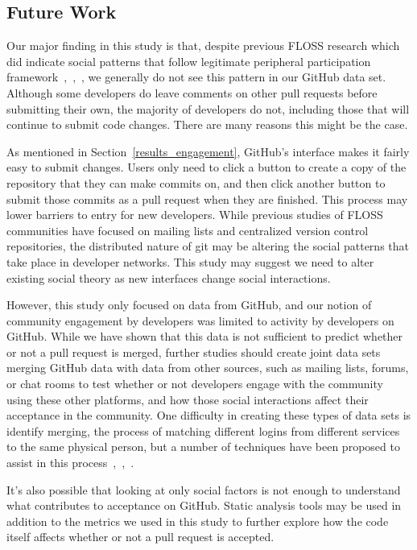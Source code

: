\documentclass{sigchi}
\begin{document}
\subsection{Future Work} \label{sec:future_work}

Our major finding in this study is that, despite previous FLOSS research which
did indicate social patterns that follow legitimate peripheral participation
framework~\cite{ducheneaut_socialization_2005},~\cite{huang_mining_2005},~\cite{ye_toward_2003},
we generally do not see this pattern in our GitHub data set. Although some
developers do leave comments on other pull requests before submitting their own,
the majority of developers do not, including those that will continue to submit
code changes. There are many reasons this might be the case.

As mentioned in Section~\ref{results_engagement}, GitHub's interface makes it
fairly easy to submit changes. Users only need to click a button to create a
copy of the repository that they can make commits on, and then click another
button to submit those commits as a pull request when they are finished. This
process may lower barriers to entry for new developers. While previous studies
of FLOSS communities have focused on mailing lists and centralized version
control repositories, the distributed nature of git may be altering the social
patterns that take place in developer networks. This study may suggest we need
to alter existing social theory as new interfaces change social interactions.

However, this study only focused on data from GitHub, and our notion of
community engagement by developers was limited to activity by developers on
GitHub. While we have shown that this data is not sufficient to predict whether
or not a pull request is merged, further studies should create joint data sets
merging GitHub data with data from other sources, such as mailing lists, forums,
or chat rooms to test whether or not developers engage with the community using
these other platforms, and how those social interactions affect their acceptance
in the community. One difficulty in creating these types of data sets is
identify merging, the process of matching different logins from different
services to the same physical person, but a number of techniques have been
proposed to assist in this
process~\cite{bird_open_2007},~\cite{goeminne_comparison_2013},~\cite{kouters_whos_2012}.

It's also possible that looking at only social factors is not enough to
understand what contributes to acceptance on GitHub. Static analysis tools may
be used in addition to the metrics we used in this study to further explore how
the code itself affects whether or not a pull request is accepted.
\end{document}
